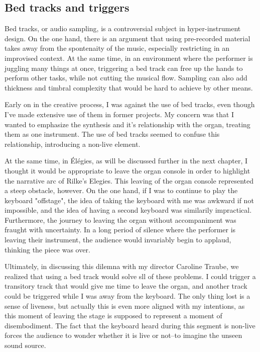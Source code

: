 \documentclass[12pt,twoside,maitrise]{dms_ks}
\theoremstyle{definition}
\begin{document}
\subsection{Bed tracks and triggers}

Bed tracks, or audio sampling, is a controversial subject in hyper-instrument design. 
On the one hand, there is an argument that using pre-recorded material takes away from the spontenaity of the music, especially restricting in an improvised context. 
At the same time, in an environment where the performer is juggling many things at once, triggering a bed track can free up the hands to perform other tasks, while not cutting the musical flow. 
Sampling can also add thickness and timbral complexity that would be hard to achieve by other means. 

Early on in the creative process, I was against the use of bed tracks, even though I've made extensive use of them in former projects. 
My concern was that I wanted to emphasize the synthesis and it's relationship with the organ, treating them as one instrument. 
The use of bed tracks seemed to confuse this relationship, introducing a non-live element.

At the same time, in Élégies, as will be discussed further in the next chapter, I thought it would be appropriate to leave the organ console in order to highlight the narrative arc of Rilke's Elegies. 
This leaving of the organ console represented a steep obstacle, however. 
On the one hand, if I was to continue to play the keyboard "offstage", the idea of taking the keyboard with me was awkward if not impossible, and the idea of having a second keyboard was similarily impractical. 
Furthermore, the journey to leaving the organ without accompaniment was fraught with uncertainty. 
In a long period of silence where the performer is leaving their instrument, the audience would invariably begin to applaud, thinking the piece was over.

Ultimately, in discussing this dilemna with my director Caroline Traube, we realized that using a bed track would solve sll of these problems. 
I could trigger a transitory track that would give me time to leave the organ, and another track could be triggered while I was away from the keyboard. 
The only thing lost is a sense of liveness, but actually this is even more aligned with my intentions, as this moment of leaving the stage is supposed to represent a moment of disembodiment. 
The fact that the keyboard heard during this segment is non-live forces the audience to wonder whether it is live or not--to imagine the unseen sound source. 
\end{document}

